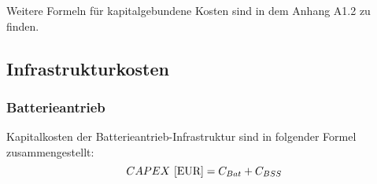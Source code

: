 Weitere Formeln für kapitalgebundene Kosten sind in dem Anhang A1.2 zu finden.
%
\subsection{Infrastrukturkosten}

\subsubsection{Batterieantrieb}
Kapitalkosten der Batterieantrieb-Infrastruktur sind in folgender Formel zusammengestellt:
%
\begin{equation}
     {CAPEX ~[\text{EUR}]} = C_{Bat} + C_{BSS} \\ %
     \label{BA_Infrastruktur}
  \end{equation}

